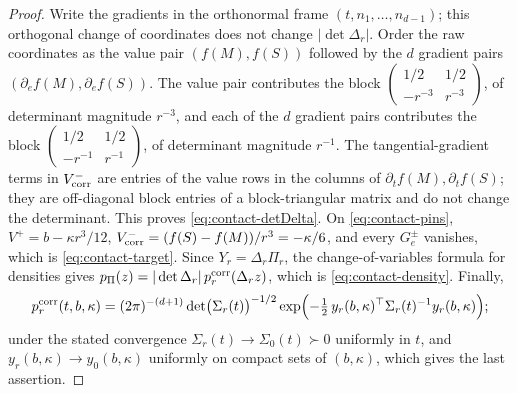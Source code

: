 \begin{proof}
Write the gradients in the orthonormal frame $(t,n_1,\dots,n_{d-1})$; this orthogonal change of coordinates does not change $|\det\Delta_r|$. Order the raw coordinates as the value pair $(f(M),f(S))$ followed by the $d$ gradient pairs $(\partial_ef(M),\partial_ef(S))$. The value pair contributes the block $\left(\begin{smallmatrix}1/2&1/2\\-r^{-3}&r^{-3}\end{smallmatrix}\right)$, of determinant magnitude $r^{-3}$, and each of the $d$ gradient pairs contributes the block $\left(\begin{smallmatrix}1/2&1/2\\-r^{-1}&r^{-1}\end{smallmatrix}\right)$, of determinant magnitude $r^{-1}$. The tangential-gradient terms in $V^-_{\rm corr}$ are entries of the value rows in the columns of $\partial_tf(M),\partial_tf(S)$; they are off-diagonal block entries of a block-triangular matrix and do not change the determinant. This proves \eqref{eq:contact-detDelta}. On \eqref{eq:contact-pins}, $V^+=b-\kappa r^3/12$, $V^-_{\rm corr}=(f(S)-f(M))/r^3=-\kappa/6$, and every $G^\pm_e$ vanishes, which is \eqref{eq:contact-target}. Since $Y_r=\Delta_r\Pi_r$, the change-of-variables formula for densities gives $p_\Pi(z)=|\det\Delta_r|\,p^{\rm corr}_r(\Delta_rz)$, which is \eqref{eq:contact-density}. Finally,
\[
p^{\rm corr}_r(t,b,\kappa)=(2\pi)^{-(d+1)}\det\bigl(\Sigma_r(t)\bigr)^{-1/2}\exp\Bigl(-\tfrac12\,y_r(b,\kappa)^{\top}\Sigma_r(t)^{-1}y_r(b,\kappa)\Bigr);
\]
under the stated convergence $\Sigma_r(t)\to\Sigma_0(t)\succ0$ uniformly in $t$, and $y_r(b,\kappa)\to y_0(b,\kappa)$ uniformly on compact sets of $(b,\kappa)$, which gives the last assertion.
\end{proof}

